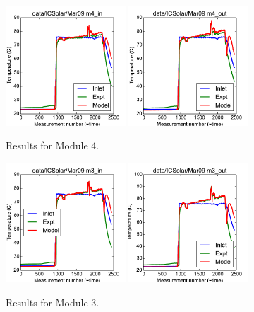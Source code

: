 \documentclass{article}
\begin{document}
\clearpage
\begin{figure}[!ht]
\centering
\includegraphics[width=0.4\textwidth]{../../data/ICSolar/images/Mar09_m4_in.pdf}\hspace{0.05\textwidth}
\includegraphics[width=0.4\textwidth]{../../data/ICSolar/images/Mar09_m4_out.pdf}\hspace{0.05\textwidth}\\
\caption{Results for Module 4.}\end{figure}
\begin{figure}[!ht]
\centering
\includegraphics[width=0.4\textwidth]{../../data/ICSolar/images/Mar09_m3_in.pdf}\hspace{0.05\textwidth}
\includegraphics[width=0.4\textwidth]{../../data/ICSolar/images/Mar09_m3_out.pdf}\hspace{0.05\textwidth}\\
\caption{Results for Module 3.}\end{figure}
\end{document}
